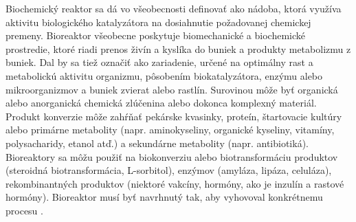 Biochemický reaktor sa dá vo všeobecnosti definovať ako nádoba, ktorá využíva aktivitu biologického katalyzátora na dosiahnutie požadovanej chemickej premeny.
%
Bioreaktor všeobecne poskytuje biomechanické a biochemické prostredie, ktoré riadi prenos živín a kyslíka do buniek a produkty metabolizmu z buniek. Dal by sa tiež označiť ako zariadenie, určené na optimálny rast a metabolickú aktivitu organizmu, pôsobením biokatalyzátora, enzýmu alebo mikroorganizmov a buniek zvierat alebo rastlín. Surovinou môže byť organická alebo anorganická chemická zlúčenina alebo dokonca komplexný materiál. Produkt konverzie môže zahŕňať pekárske kvasinky, proteín, štartovacie kultúry alebo primárne metabolity (napr. aminokyseliny, organické kyseliny, vitamíny, polysacharidy, etanol atď.) a sekundárne metabolity (napr. antibiotiká). Bioreaktory sa môžu použiť na biokonverziu alebo biotransformáciu produktov (steroidná biotransformácia, L-sorbitol), enzýmov (amyláza, lipáza, celuláza), rekombinantných produktov (niektoré vakcíny, hormóny, ako je inzulín a rastové hormóny). Bioreaktor musí byť navrhnutý tak, aby vyhovoval konkrétnemu procesu \cite{ref1}.

